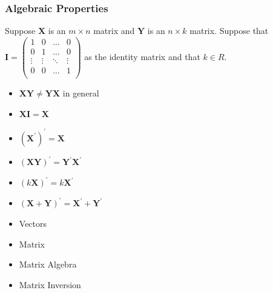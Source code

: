 \documentclass[handout]{beamer}
\numberwithin{equation}{section}
\begin{document}
\begin{frame}
\frametitle{Algebraic Properties} 

Suppose $\boldsymbol{X}$ is an $m \times n$ matrix and $\boldsymbol{Y}$ is an $n \times k$ matrix.  Suppose that $\boldsymbol{I} = \begin{pmatrix} 1 & 0 & \hdots & 0 \\
						0 & 1 & \hdots & 0 \\
						\vdots & \vdots & \ddots & \vdots \\
						0 			&   0 		& \hdots & 1 \\
						\end{pmatrix} $ as the identity matrix and that $k \in R$. \pause  
\begin{itemize}
\item[-] $\boldsymbol{X} \boldsymbol{Y} \neq \boldsymbol{Y} \boldsymbol{X}$ in general \pause
\item[-] $\boldsymbol{X}\boldsymbol{I} = \boldsymbol{X}$ \pause
\item[-] $(\boldsymbol{X}^{'} )^{'} = \boldsymbol{X}$ \pause
\item[-] $(\boldsymbol{X} \boldsymbol{Y})^{'} = \boldsymbol{Y}^{'} \boldsymbol{X}^{'}$ \pause
\item[-] $(k \boldsymbol{X})^{'} = k \boldsymbol{X}^{'}$ \pause
\item[-] $(\boldsymbol{X} + \boldsymbol{Y})^{'}  = \boldsymbol{X}^{'} + \boldsymbol{Y}^{'} $
\end{itemize}

\end{frame}



\begin{frame}

\begin{itemize}
\item \textcolor{mygray}{Vectors}
\item \textcolor{mygray}{Matrix}
\item \textcolor{mygray}{Matrix Algebra}
\item \textcolor{myblack}{Matrix Inversion}
\end{itemize}

\end{frame}
\end{document}

